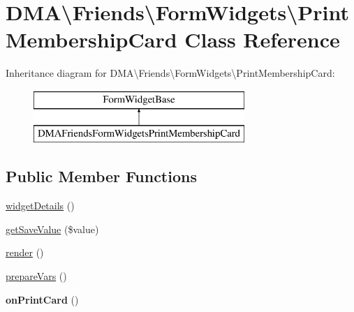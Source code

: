 \hypertarget{classDMA_1_1Friends_1_1FormWidgets_1_1PrintMembershipCard}{\section{D\+M\+A\textbackslash{}Friends\textbackslash{}Form\+Widgets\textbackslash{}Print\+Membership\+Card Class Reference}
\label{classDMA_1_1Friends_1_1FormWidgets_1_1PrintMembershipCard}
}
Inheritance diagram for D\+M\+A\textbackslash{}Friends\textbackslash{}Form\+Widgets\textbackslash{}Print\+Membership\+Card\+:\begin{figure}[H]
\begin{center}
\leavevmode
\includegraphics[height=2.000000cm]{dd/daf/classDMA_1_1Friends_1_1FormWidgets_1_1PrintMembershipCard}
\end{center}
\end{figure}
\subsection*{Public Member Functions}
\begin{DoxyCompactItemize}
\item 
\hyperlink{classDMA_1_1Friends_1_1FormWidgets_1_1PrintMembershipCard_a61fed2675f8a9c82aeca689e2b830398}{widget\+Details} ()
\item 
\hyperlink{classDMA_1_1Friends_1_1FormWidgets_1_1PrintMembershipCard_aca62e175104a7666f52536e39e82f04c}{get\+Save\+Value} (\$value)
\item 
\hyperlink{classDMA_1_1Friends_1_1FormWidgets_1_1PrintMembershipCard_a8c4f95cd05d67d9df92e63b0b7a80603}{render} ()
\item 
\hyperlink{classDMA_1_1Friends_1_1FormWidgets_1_1PrintMembershipCard_a4e196d8afe047a8c570e3ae70fba5959}{prepare\+Vars} ()
\item 
\hypertarget{classDMA_1_1Friends_1_1FormWidgets_1_1PrintMembershipCard_a6cdc323921452cf7ccd3e8642be7109f}{{\bfseries on\+Print\+Card} ()}\label{classDMA_1_1Friends_1_1FormWidgets_1_1PrintMembershipCard_a6cdc323921452cf7ccd3e8642be7109f}

\end{DoxyCompactItemize}
